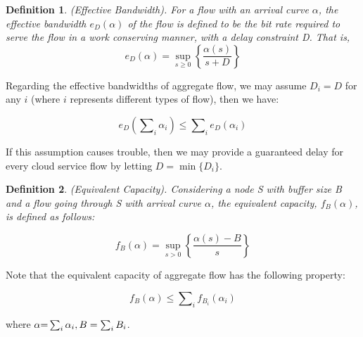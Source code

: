 \documentclass[a4paper]{article}
\newtheorem{definition}{Definition}
\begin{document}
\begin{definition}
(Effective Bandwidth). For a flow with an arrival curve $\alpha$, the effective bandwidth ${e_D}(\alpha )$ of the flow is defined to be the bit rate required to serve the flow in a work conserving manner, with a delay constraint D. That is,
\begin{equation}\label{}
  {e_D}(\alpha ) = {\sup _{s \ge 0}}\left\{ {\frac{{\alpha (s)}}{{s + D}}} \right\}
\end{equation}

\end{definition}

Regarding the effective bandwidths of aggregate flow, we may assume ${D_i} = D$ for any $i$ (where $i$ represents different types of flow), then we have:

\begin{equation}\label{eq:3.6}
  {e_D}(\sum\nolimits_i {{\alpha _i}} ) \le \sum\nolimits_i {{e_D}} ({\alpha _i})
\end{equation}

If this assumption causes trouble, then we may provide a guaranteed delay for every cloud service flow by letting $D = \min \{ {D_i}\}$.

\begin{definition}
(Equivalent Capacity). Considering a node S with buffer size B and a flow going through S with arrival curve $\alpha$, the equivalent capacity, ${f_B}(\alpha )$, is defined as follows:

\begin{equation}\label{}
  {f_B}(\alpha ) = {\sup _{s > 0}}\left\{ {\frac{{\alpha (s) - B}}{s}} \right\}
\end{equation}
\end{definition}

Note that the equivalent capacity of aggregate flow has the following property:

\begin{equation}\label{eq:3.8}
  {f_B}(\alpha ) \le \sum\nolimits_i {{f_{{B_i}}}} ({\alpha _i})
\end{equation}

\noindent where $\alpha {\rm{ = }}\sum\nolimits_i {{\alpha _i}} ,B = \sum\nolimits_i {{B_i}}$.
\end{document}
